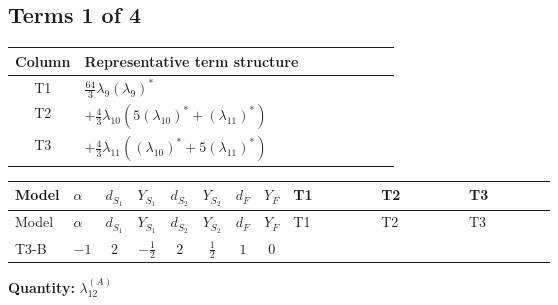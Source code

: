 \documentclass[8pt]{article}
\begin{document}
\begin{landscape}
\subsection*{Terms 1 of 4}
\begin{center}
\begin{tabular}{@{}c >{\raggedright\arraybackslash}p{0.82\linewidth}@{}}
\toprule
Column & Representative term structure \\
\midrule
T1 & \(\displaystyle \frac{64}{3} {\lambda_{9}} \left({\lambda_{9}}\right)^{*}\) \\
\midrule
T2 & \(\displaystyle +\frac{4}{3} {\lambda_{10}} (5 \left({\lambda_{10}}\right)^{*}+\left({\lambda_{11}}\right)^{*})\) \\
\midrule
T3 & \(\displaystyle +\frac{4}{3} {\lambda_{11}} (\left({\lambda_{10}}\right)^{*}+5 \left({\lambda_{11}}\right)^{*})\) \\
\midrule
\bottomrule
\end{tabular}
\end{center}
\smallskip
\tiny
\begin{longtable}{@{}llcccccc >{\raggedright\arraybackslash}p{0.21\linewidth} >{\raggedright\arraybackslash}p{0.21\linewidth} >{\raggedright\arraybackslash}p{0.21\linewidth}@{}}
\toprule
Model & $\alpha$ & $d_{S_1}$ & $Y_{S_1}$ & $d_{S_2}$ & $Y_{S_2}$ & $d_F$ & $Y_F$ & T1 & T2 & T3 \\
\midrule
\endfirsthead
\toprule
Model & $\alpha$ & $d_{S_1}$ & $Y_{S_1}$ & $d_{S_2}$ & $Y_{S_2}$ & $d_F$ & $Y_F$ & T1 & T2 & T3 \\
\midrule
\endhead
T3-B & $-1$ & $2$ & $-\frac{1}{2}$ & $2$ & $\frac{1}{2}$ & $1$ & $0$ & \scriptsize\adjustbox{max width=\linewidth}{$\begin{gathered} \frac{64}{3} {\lambda_{9}} \left({\lambda_{9}}\right)^{*}\end{gathered}$} & \scriptsize\adjustbox{max width=\linewidth}{$\begin{gathered} +\frac{4}{3} {\lambda_{10}} (5 \left({\lambda_{10}}\right)^{*}+\left({\lambda_{11}}\right)^{*})\end{gathered}$} & \scriptsize\adjustbox{max width=\linewidth}{$\begin{gathered} +\frac{4}{3} {\lambda_{11}} (\left({\lambda_{10}}\right)^{*}+5 \left({\lambda_{11}}\right)^{*})\end{gathered}$} \\
\midrule
\bottomrule
\end{longtable}
\clearpage
\noindent\textbf{Quantity: }$\lambda_{12}^{(A)}$\par\smallskip

\end{landscape}
\end{document}
